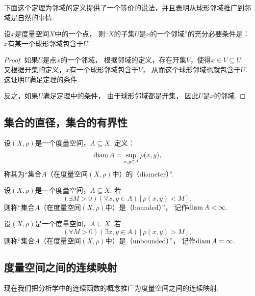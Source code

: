 下面这个定理为邻域的定义提供了一个等价的说法，并且表明从球形邻域推广到邻域是自然的事情.
\begin{theorem}\label{theorem:度量空间.邻域的判定}
设\(x\)是度量空间\(X\)中的一个点，
则“\(X\)的子集\(U\)是\(x\)的一个邻域”的充分必要条件是：
\(x\)有某一个球形邻域包含于\(U\).
\begin{proof}
如果\(U\)是点\(x\)的一个邻域，
根据邻域的定义，存在开集\(V\)，使得\(x \in V \subseteq U\).
又根据开集的定义，\(x\)有一个球形邻域包含于\(V\)，
从而这个球形邻域也就包含于\(U\).
这证明\(U\)满足定理的条件.

反之，如果\(U\)满足定理中的条件，
由于球形邻域都是开集，
因此\(U\)是\(x\)的邻域.
\end{proof}
\end{theorem}

\subsection{集合的直径，集合的有界性}
\begin{definition}
设\((X,\rho)\)是一个度量空间，\(A \subseteq X\).
定义：\begin{equation*}
	\operatorname{diam} A = \sup_{x,y \in A} \rho(x,y),
\end{equation*}
称其为“集合\(A\)（在度量空间\((X,\rho)\)中）的（diameter）”.
\end{definition}
\begin{definition}
设\((X,\rho)\)是一个度量空间，\(A \subseteq X\).
若\begin{equation*}
	(\exists M>0)
	(\forall x,y \in A)
	[\rho(x,y) < M],
\end{equation*}
则称“集合\(A\)（在度量空间\((X,\rho)\)中）是（bounded）”，
记作\(\operatorname{diam} A < \infty\).
\end{definition}
\begin{definition}
设\((X,\rho)\)是一个度量空间，\(A \subseteq X\).
若\begin{equation*}
	(\forall M>0)
	(\exists x,y \in A)
	[\rho(x,y) > M],
\end{equation*}
则称“集合\(A\)（在度量空间\((X,\rho)\)中）是（unbounded）”，
记作\(\operatorname{diam} A = \infty\).
\end{definition}

\subsection{度量空间之间的连续映射}
现在我们把分析学中的连续函数的概念推广为度量空间之间的连续映射.

